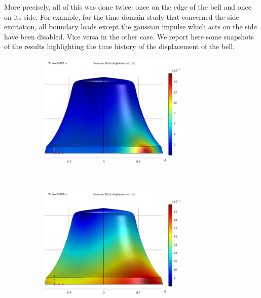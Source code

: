 \documentclass[a4paper]{article}
\begin{document}
More precisely, all of this was done twice: once on the edge of the bell and once on its side. For example, for the time domain study that concerned the side excitation, all boundary loads except the gaussian impulse which acts on the side have been disabled. Vice versa in the other case. We report here some snapshots of the results highlighting the time history of the displacement of the bell. 

\begin{figure}[h!]
	\centering
	\begin{subfigure}{0.47\textwidth}
		\includegraphics[width=0.8\textwidth]{time domain study edge/initial time.png}
	\end{subfigure}
	~
	\begin{subfigure}{0.47\textwidth}
		\includegraphics[width=0.8\textwidth]{time domain study edge/initial time 2.png}
	\end{subfigure}
	

\end{figure}
\end{document}
